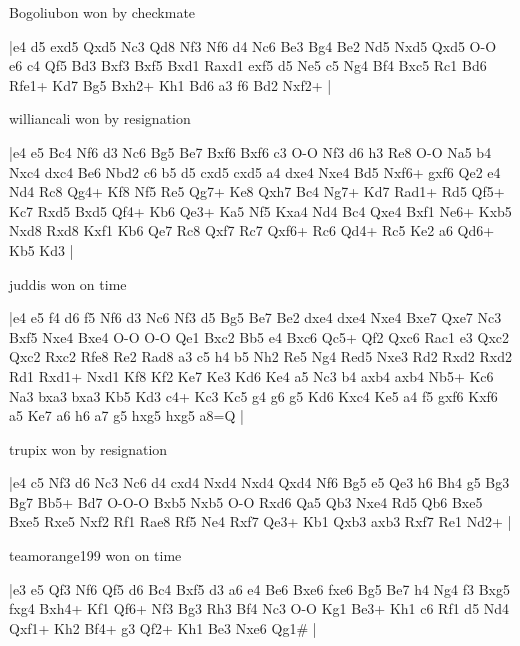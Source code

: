 \showboard

Bogoliubon won by checkmate

\makegametitle
|e4 d5 exd5 Qxd5 Nc3 Qd8 Nf3 Nf6 d4 Nc6 Be3 Bg4 Be2 Nd5 Nxd5 Qxd5 O-O e6 c4 Qf5 Bd3 Bxf3 Bxf5 Bxd1 Raxd1 exf5 d5 Ne5 c5 Ng4 Bf4 Bxc5 Rc1 Bd6 Rfe1+ Kd7 Bg5 Bxh2+ Kh1 Bd6 a3 f6 Bd2 Nxf2+  |

\showboard

williancali won by resignation

\makegametitle
|e4 e5 Bc4 Nf6 d3 Nc6 Bg5 Be7 Bxf6 Bxf6 c3 O-O Nf3 d6 h3 Re8 O-O Na5 b4 Nxc4 dxc4 Be6 Nbd2 c6 b5 d5 cxd5 cxd5 a4 dxe4 Nxe4 Bd5 Nxf6+ gxf6 Qe2 e4 Nd4 Rc8 Qg4+ Kf8 Nf5 Re5 Qg7+ Ke8 Qxh7 Bc4 Ng7+ Kd7 Rad1+ Rd5 Qf5+ Kc7 Rxd5 Bxd5 Qf4+ Kb6 Qe3+ Ka5 Nf5 Kxa4 Nd4 Bc4 Qxe4 Bxf1 Ne6+ Kxb5 Nxd8 Rxd8 Kxf1 Kb6 Qe7 Rc8 Qxf7 Rc7 Qxf6+ Rc6 Qd4+ Rc5 Ke2 a6 Qd6+ Kb5 Kd3  |

\showboard

juddis won on time

\makegametitle
|e4 e5 f4 d6 f5 Nf6 d3 Nc6 Nf3 d5 Bg5 Be7 Be2 dxe4 dxe4 Nxe4 Bxe7 Qxe7 Nc3 Bxf5 Nxe4 Bxe4 O-O O-O Qe1 Bxc2 Bb5 e4 Bxc6 Qc5+ Qf2 Qxc6 Rac1 e3 Qxc2 Qxc2 Rxc2 Rfe8 Re2 Rad8 a3 c5 h4 b5 Nh2 Re5 Ng4 Red5 Nxe3 Rd2 Rxd2 Rxd2 Rd1 Rxd1+ Nxd1 Kf8 Kf2 Ke7 Ke3 Kd6 Ke4 a5 Nc3 b4 axb4 axb4 Nb5+ Kc6 Na3 bxa3 bxa3 Kb5 Kd3 c4+ Kc3 Kc5 g4 g6 g5 Kd6 Kxc4 Ke5 a4 f5 gxf6 Kxf6 a5 Ke7 a6 h6 a7 g5 hxg5 hxg5 a8=Q  |

\showboard

trupix won by resignation

\makegametitle
|e4 c5 Nf3 d6 Nc3 Nc6 d4 cxd4 Nxd4 Nxd4 Qxd4 Nf6 Bg5 e5 Qe3 h6 Bh4 g5 Bg3 Bg7 Bb5+ Bd7 O-O-O Bxb5 Nxb5 O-O Rxd6 Qa5 Qb3 Nxe4 Rd5 Qb6 Bxe5 Bxe5 Rxe5 Nxf2 Rf1 Rae8 Rf5 Ne4 Rxf7 Qe3+ Kb1 Qxb3 axb3 Rxf7 Re1 Nd2+  |

\showboard

teamorange199 won on time

\makegametitle
|e3 e5 Qf3 Nf6 Qf5 d6 Bc4 Bxf5 d3 a6 e4 Be6 Bxe6 fxe6 Bg5 Be7 h4 Ng4 f3 Bxg5 fxg4 Bxh4+ Kf1 Qf6+ Nf3 Bg3 Rh3 Bf4 Nc3 O-O Kg1 Be3+ Kh1 c6 Rf1 d5 Nd4 Qxf1+ Kh2 Bf4+ g3 Qf2+ Kh1 Be3 Nxe6 Qg1\#  |

